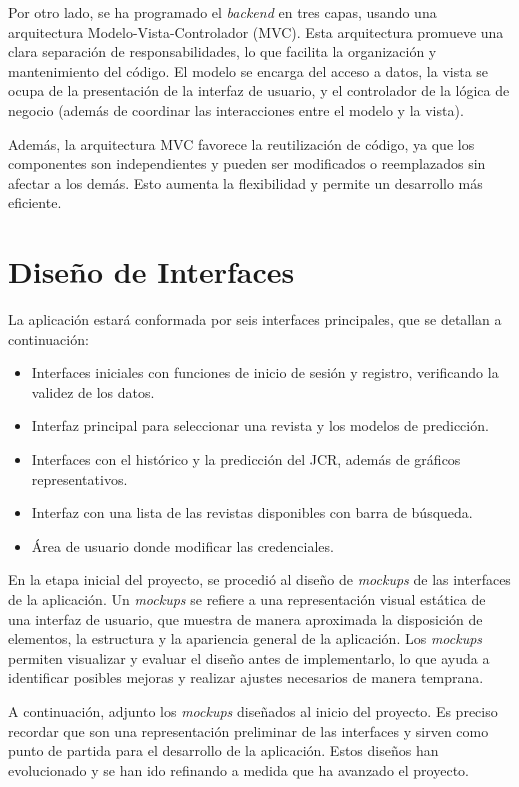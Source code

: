 Por otro lado, se ha programado el \textit{backend} en tres capas, usando una arquitectura Modelo-Vista-Controlador (MVC). Esta arquitectura promueve una clara separación de responsabilidades, lo que facilita la organización y mantenimiento del código. El modelo se encarga del acceso a datos, la vista se ocupa de la presentación de la interfaz de usuario, y el controlador de la lógica de negocio (además de coordinar las interacciones entre el modelo y la vista).

Además, la arquitectura MVC favorece la reutilización de código, ya que los componentes son independientes y pueden ser modificados o reemplazados sin afectar a los demás. Esto aumenta la flexibilidad y permite un desarrollo más eficiente.



\section{Diseño de Interfaces}
La aplicación estará conformada por seis interfaces principales, que se detallan a continuación:

\begin{itemize}
    \item Interfaces iniciales con funciones de inicio de sesión y registro, verificando la validez de los datos.
    \item Interfaz principal para seleccionar una revista y los modelos de predicción.
    \item Interfaces con el histórico y la predicción del JCR, además de gráficos representativos.
    \item Interfaz con una lista de las revistas disponibles con barra de búsqueda.
    \item Área de usuario donde modificar las credenciales.
\end{itemize}

En la etapa inicial del proyecto, se procedió al diseño de \textit{mockups} de las interfaces de la aplicación. Un \textit{mockups} se refiere a una representación visual estática de una interfaz de usuario, que muestra de manera aproximada la disposición de elementos, la estructura y la apariencia general de la aplicación. Los \textit{mockups} permiten visualizar y evaluar el diseño antes de implementarlo, lo que ayuda a identificar posibles mejoras y realizar ajustes necesarios de manera temprana.

A continuación, adjunto los \textit{mockups} diseñados al inicio del proyecto. Es preciso recordar que son una representación preliminar de las interfaces y sirven como punto de partida para el desarrollo de la aplicación. Estos diseños han evolucionado y se han ido refinando a medida que ha avanzado el proyecto.

